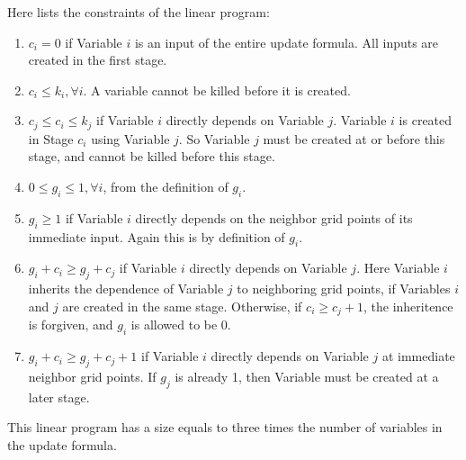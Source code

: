 \documentclass[12pt]{article}
\begin{document}
Here lists the constraints of the linear program:
\begin{enumerate}
\item
$c_i = 0$ if Variable $i$ is an input of the entire update formula.
All inputs are created in the first stage.
\item 
$c_i \le k_i, \forall i$.  A variable cannot be killed before it is created.
\item
$c_j \le c_i \le k_j$ if Variable $i$ directly depends on Variable $j$.  Variable $i$ is created in Stage $c_i$ using Variable $j$.  So Variable $j$ must be created at or before this stage, and cannot be killed before this stage.
\item $0 \le g_i \le 1, \forall i$, from the definition of $g_i$.
\item $g_i \ge 1$ if Variable $i$ directly depends on the neighbor grid points of its immediate input.  Again this is by definition of $g_i$. 
\item $g_i + c_i \ge g_j + c_j$ if Variable $i$ directly depends on Variable $j$.  Here Variable $i$ inherits the dependence of Variable $j$ to neighboring grid points, if Variables $i$ and $j$ are created in the same stage.  Otherwise, if $c_i \ge c_j + 1$, the inheritence is forgiven, and $g_i$ is allowed to be 0.
\item $g_i + c_i \ge g_j + c_j + 1$ if Variable $i$ directly depends on Variable $j$ at immediate neighbor grid points.  If $g_j$ is already 1, then Variable must be created at a later stage.
\end{enumerate}
This linear program has a size equals to three times the number of variables in the update formula.
\end{document}
